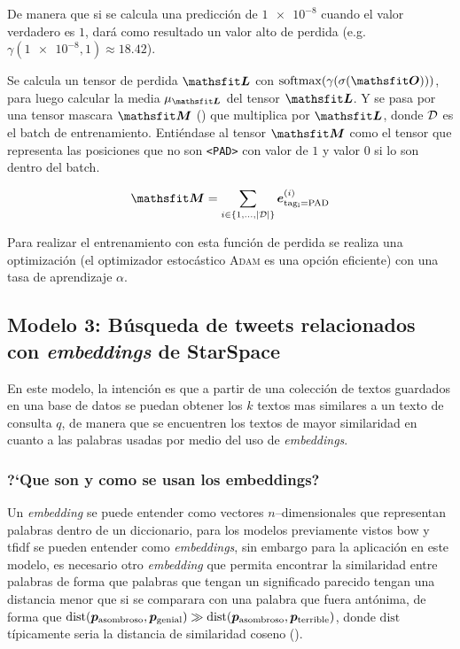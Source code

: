 De manera que si se calcula una predicción de $\num{1e-8}$ cuando el valor verdadero es $1$, dará como resultado un valor alto de perdida (e.g. $\gamma(\num{1e-8}, 1) \approx \num{18.42}$).

Se calcula un tensor de perdida $\tL$ con $\softmax(\gamma(\sigmoid(\tO)))$, para luego calcular la media $\mu_{\tL}$ del tensor $\tL$. Y se pasa por una tensor mascara $\tM$ () que multiplica por $\tL$, donde $\mathcal{D}$ es el batch de entrenamiento. Entiéndase al tensor $\tM$ como el tensor que representa las posiciones que no son \texttt{<PAD>} con valor de $1$ y valor $0$ si lo son dentro del batch.

\begin{equation} \label{eq:bilstm-mask-tensor}
  \tM = \sum_{i \in \{1, \ldots, |\train|\}} \ve_{\mathrm{tag_i = \mathrm{PAD}}}^{(i)}
\end{equation}

Para realizar el entrenamiento con esta función de perdida se realiza una optimización (el optimizador estocástico \textsc{Adam} \cite{Kingma2014} es una opción eficiente) con una tasa de aprendizaje $\alpha$.


\subsection{Modelo 3: Búsqueda de tweets relacionados con \emph{embeddings} de \mbox{StarSpace}}
En este modelo, la intención es que a partir de una colección de textos guardados en una base de datos se puedan obtener los $k$ textos mas similares a un texto de consulta $q$, de manera que se encuentren los textos de mayor similaridad en cuanto a las palabras usadas por medio del uso de \emph{embeddings}.

\subsubsection{?`Que son y como se usan los embeddings?}
Un \emph{embedding} se puede entender como vectores $n$--dimensionales que representan palabras dentro de un diccionario, para los modelos previamente vistos \gls{bow} y \gls{tfidf} se pueden entender como \emph{embeddings}, sin embargo para la aplicación en este modelo, es necesario otro \emph{embedding} que permita encontrar la similaridad entre palabras de forma que palabras que tengan un significado parecido tengan una distancia menor que si se comparara con una palabra que fuera antónima, de forma que $\mathrm{dist}({\bm{p}}_{\mathrm{asombroso}}, {\bm{p}}_{\mathrm{genial}}) \gg \mathrm{dist}({\bm{p}}_{\mathrm{asombroso}}, {\bm{p}}_{\mathrm{terrible}})$, donde $\mathrm{dist}$ típicamente seria la distancia de similaridad coseno ().

